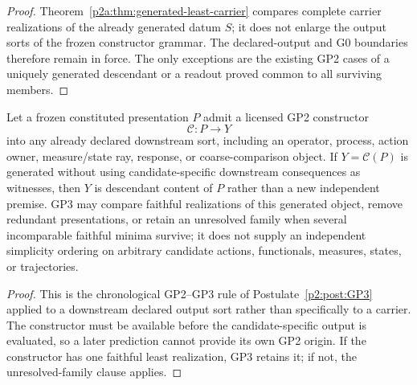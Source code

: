 \documentclass[12pt,a4paper]{article}
\begin{document}
\begin{proof}
Theorem~\ref{p2a:thm:generated-least-carrier} compares complete carrier
realizations of the already generated datum $S$; it does not enlarge the
output sorts of the frozen constructor grammar.  The declared-output and G0
boundaries therefore remain in force.  The only exceptions are the existing
GP2 cases of a uniquely generated descendant or a readout proved common to all
surviving members.
\end{proof}

\begin{corollary}
\label{p2a:cor:generated-constructor-chronology}
Let a frozen constituted presentation $P$ admit a licensed GP2 constructor
\[
 \mathcal C:P\longrightarrow Y
\]
into any already declared downstream sort, including an operator, process,
action owner, measure/state ray, response, or coarse-comparison object.  If
$Y=\mathcal C(P)$ is generated without using candidate-specific downstream
consequences as witnesses, then $Y$ is descendant content of $P$ rather than
a new independent premise.  GP3 may compare faithful realizations of this
generated object, remove redundant presentations, or retain an unresolved
family when several incomparable faithful minima survive; it does not supply
an independent simplicity ordering on arbitrary candidate actions,
functionals, measures, states, or trajectories.
\end{corollary}

\begin{proof}
This is the chronological GP2--GP3 rule of
Postulate~\ref{p2:post:GP3} applied to a downstream declared output sort rather
than specifically to a carrier.  The constructor must be available before the
candidate-specific output is evaluated, so a later prediction cannot provide
its own GP2 origin.  If the constructor has one faithful least realization,
GP3 retains it; if not, the unresolved-family clause applies.
\end{proof}
\end{document}
